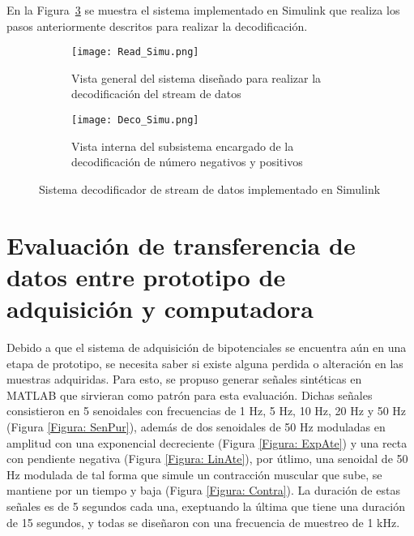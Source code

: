 En la Figura~\ref{Figura: DecoSimuT} se muestra el sistema implementado en Simulink que realiza los pasos anteriormente descritos para realizar la decodificación.

\begin{figure}[htbp]
	\centering
	\begin{subfigure}[htbp]{0.6\textwidth}
		\texttt{[image: Read\_Simu.png]}
		\caption{Vista general del sistema diseñado para realizar la decodificación del stream de datos}
		\label{Figura: readSimu}
	\end{subfigure}
	\begin{subfigure}[htbp]{0.6\textwidth}
		\texttt{[image: Deco\_Simu.png]}
		\caption{Vista interna del subsistema encargado de la decodificación de número negativos y positivos}
		\label{Figura: decoSimu}
	\end{subfigure}
	\caption{Sistema decodificador de stream de datos implementado en Simulink}
	\label{Figura: DecoSimuT}
\end{figure}

\newpage
\section{Evaluación de transferencia de datos entre prototipo de adquisición y computadora}
Debido a que el sistema de adquisición de bipotenciales se encuentra aún en una etapa de prototipo, se necesita saber si existe alguna perdida o alteración en las muestras adquiridas. Para esto, se propuso generar señales sintéticas en MATLAB que sirvieran como patrón para esta evaluación. Dichas señales consistieron en 5 senoidales con frecuencias de 1 Hz, 5 Hz, 10 Hz, 20 Hz y 50 Hz (Figura \ref{Figura: SenPur}), además de dos senoidales de 50 Hz moduladas en amplitud con una exponencial decreciente (Figura \ref{Figura: ExpAte}) y una recta con pendiente negativa (Figura \ref{Figura: LinAte}), por útlimo, una senoidal de 50 Hz modulada de tal forma que simule un contracción muscular que sube, se mantiene por un tiempo y baja (Figura \ref{Figura: Contra}). La duración de estas señales es de 5 segundos cada una, exeptuando la última que tiene una duración de 15 segundos, y todas se diseñaron con una frecuencia de muestreo de 1 kHz.

